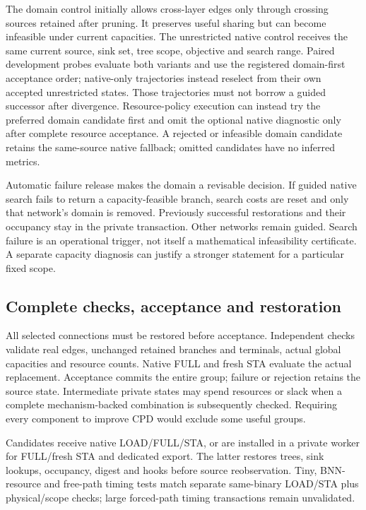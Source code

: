 \documentclass[conference,10pt]{IEEEtran}
\begin{document}
The domain control initially allows cross-layer edges only through crossing sources retained after pruning. It preserves useful sharing but can become infeasible under current capacities. The unrestricted native control receives the same current source, sink set, tree scope, objective and search range. Paired development probes evaluate both variants and use the registered domain-first acceptance order; native-only trajectories instead reselect from their own accepted unrestricted states. Those trajectories must not borrow a guided successor after divergence. Resource-policy execution can instead try the preferred domain candidate first and omit the optional native diagnostic only after complete resource acceptance. A rejected or infeasible domain candidate retains the same-source native fallback; omitted candidates have no inferred metrics.

Automatic failure release makes the domain a revisable decision. If guided native search fails to return a capacity-feasible branch, search costs are reset and only that network's domain is removed. Previously successful restorations and their occupancy stay in the private transaction. Other networks remain guided. Search failure is an operational trigger, not itself a mathematical infeasibility certificate. A separate capacity diagnosis can justify a stronger statement for a particular fixed scope.

\subsection{Complete checks, acceptance and restoration}
All selected connections must be restored before acceptance. Independent checks validate real edges, unchanged retained branches and terminals, actual global capacities and resource counts. Native FULL and fresh STA evaluate the actual replacement. Acceptance commits the entire group; failure or rejection retains the source state. Intermediate private states may spend resources or slack when a complete mechanism-backed combination is subsequently checked. Requiring every component to improve CPD would exclude some useful groups.

Candidates receive native LOAD/FULL/STA, or are installed in a private worker for FULL/fresh STA and dedicated export. The latter restores trees, sink lookups, occupancy, digest and hooks before source reobservation. Tiny, BNN-resource and free-path timing tests match separate same-binary LOAD/STA plus physical/scope checks; large forced-path timing transactions remain unvalidated.
\end{document}
